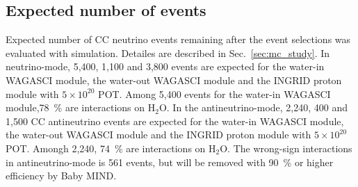 \subsection{Expected number of events}
Expected number of CC neutrino events remaining after the event selections was evaluated with simulation.
Detailes are described in Sec.~\ref{sec:mc_study}.
In neutrino-mode, 5,400, 1,100 and 3,800 events are expected for the water-in WAGASCI module, the water-out WAGASCI module and the INGRID proton module with $5\times 10^{20}$ POT.  Among 5,400 events for the water-in WAGASCI module,78~\%  are interactions on $\mathrm{H_2O}$.
In the antineutrino-mode, 2,240, 400 and 1,500 CC antineutrino events are expected for the water-in WAGASCI module, the water-out WAGASCI module and the INGRID proton module with $5\times 10^{20}$ POT. Amongh 2,240, 74~\% are interactions on $\mathrm{H_2O}$.
The wrong-sign interactions in antineutrino-mode is 561 events, but will be removed with 90~\% or higher efficiency by Baby MIND.




